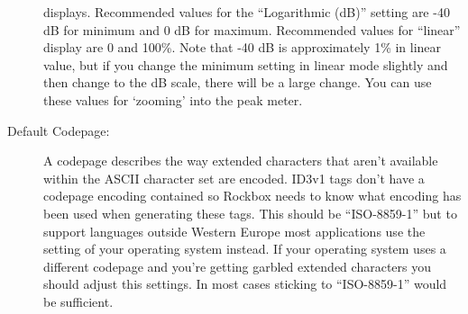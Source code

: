 \begin{description}
{\begin{description}
        displays. Recommended values for the ``Logarithmic (dB)'' setting 
        are {}-40 dB for minimum and 0 dB for maximum. Recommended values 
        for ``linear'' display are 0 and 100\%. Note that {}-40 dB is 
        approximately 1\% in linear value, but if you change the minimum 
        setting in linear mode slightly and then change to the dB scale, 
        there will be a large change. You can use these values for `zooming' 
        into the peak meter.
      \end{description}
    }
    \item[Default Codepage:]
      A codepage describes the way extended characters that aren't available
      within the ASCII character set are encoded. ID3v1 tags don't have a 
      codepage encoding contained so Rockbox needs to know what encoding has
      been used when generating these tags. This should be ``ISO-8859-1'' but
      to support languages outside Western Europe most applications use
      the setting of your operating system instead. If your operating system
      uses a different codepage and you're getting garbled extended characters
      you should adjust this settings. In most cases sticking to 
      ``ISO-8859-1'' would be sufficient.
  \end{description}

